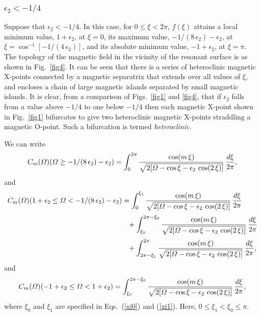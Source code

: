 \documentclass[12pt,prb,aps]{revtex4-1}
\begin{document}
\subsubsection{$\epsilon_2<-1/4$}
Suppose that $\epsilon_2<- 1/4$. In this case, for $0\leq \xi< 2\pi$, $f(\xi)$ attains a local minimum value, $1+\epsilon_2$, at $\xi=0$, its  maximum value, $-1/(8\,\epsilon_2)-\epsilon_2$, at $\xi=\cos^{-1}[-1/(4\,\epsilon_2)]$,
and its absolute minimum value, $-1+\epsilon_2$, at $\xi=\pi$.    The topology of the magnetic field 
in the vicinity of the resonant surface is as shown in Fig.~\ref{fig4}. It can be seen that there is  a series of heteroclinic 
magnetic X-points connected by a
magnetic separatrix that extends over all values of $\xi$, and encloses a chain of large magnetic islands separated by small
magnetic islands. It is clear, from a comparison of Figs.~\ref{fig1} and \ref{fig4},  that if $\epsilon_2$ falls from a value above $-1/4$ to one below $-1/4$ then each magnetic X-point
shown in Fig.~\ref{fig1} bifurcates to give two heteroclinic magnetic X-points straddling a magnetic O-point. Such a bifurcation is termed {\em heteroclinic}. 

We can write 
\begin{equation}
C_m({\mit\Omega})({\mit\Omega}\geq -1/(8\,\epsilon_2)-\epsilon_2) = \int_0^{2\pi}
\frac{\cos(m\,\xi)}{\sqrt{2[{\mit\Omega}-\cos\xi-\epsilon_2\,\cos(2\,\xi)]}}\,\frac{d\xi}{2\pi},
\end{equation} 
and
\begin{align}
C_m({\mit\Omega})(1+\epsilon_2\leq {\mit\Omega}< -1/(8\,\epsilon_2)-\epsilon_2) &= \int_{0}^{\xi_1}
\frac{\cos(m\,\xi)}{\sqrt{2[{\mit\Omega}-\cos\xi-\epsilon_2\,\cos(2\,\xi)]}}\,\frac{d\xi}{2\pi}\nonumber\\[0.5ex]
&\phantom{=}+\int_{\xi_0}^{2\pi-\xi_0}
\frac{\cos(m\,\xi)}{\sqrt{2[{\mit\Omega}-\cos\xi-\epsilon_2\,\cos(2\,\xi)]}}\,\frac{d\xi}{2\pi}\nonumber\\[0.5ex]
&\phantom{=}+\int_{2\pi-\xi_1}^{2\pi}
\frac{\cos(m\,\xi)}{\sqrt{2[{\mit\Omega}-\cos\xi-\epsilon_2\,\cos(2\,\xi)]}}\,\frac{d\xi}{2\pi},
\end{align} 
and
\begin{align}
C_m({\mit\Omega})(-1+\epsilon_2 \leq {\mit\Omega}< 1+\epsilon_2) = \int_{\xi_0}^{2\pi-\xi_0}
\frac{\cos(m\,\xi)}{\sqrt{2[{\mit\Omega}-\cos\xi-\epsilon_2\,\cos(2\,\xi)]}}\,\frac{d\xi}{2\pi},
\end{align} 
where $\xi_0$ and $\xi_1$ are specified in Eqs.~(\ref{xi0}) and (\ref{xi1}). 
Here, $0\leq \xi_1<\xi_0\leq \pi$. 
\end{document}
